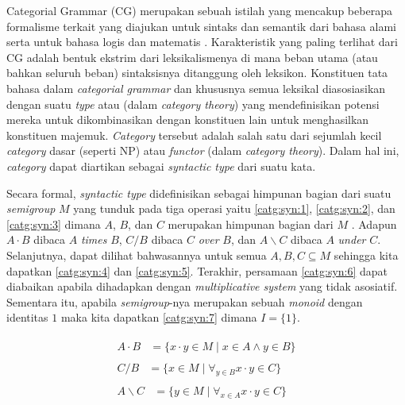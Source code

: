 Categorial Grammar (CG) merupakan sebuah istilah yang mencakup beberapa formalisme terkait yang diajukan
untuk sintaks dan semantik dari bahasa alami serta untuk bahasa logis dan matematis \citep{Steedman92catg}.
Karakteristik yang paling terlihat dari CG adalah bentuk ekstrim dari leksikalismenya di mana beban utama
(atau bahkan seluruh beban) sintaksisnya ditanggung oleh leksikon.
Konstituen tata bahasa dalam \textit{categorial grammar} dan khususnya semua leksikal diasosiasikan
dengan suatu \textit{type} atau  (dalam \textit{category theory}) yang
mendefinisikan potensi mereka untuk dikombinasikan dengan konstituen lain untuk menghasilkan konstituen
majemuk.
\textit{Category} tersebut adalah salah satu dari sejumlah kecil \textit{category} dasar (seperti NP)
atau \textit{functor} (dalam \textit{category theory}).
Dalam hal ini, \textit{category} dapat diartikan sebagai \textit{syntactic type} dari suatu kata.

Secara formal, \textit{syntactic type} didefinisikan sebagai himpunan bagian dari suatu
\textit{semigroup} $M$ yang tunduk pada tiga operasi yaitu \ref{catg:syn:1},
\ref{catg:syn:2}, dan \ref{catg:syn:3} dimana $A$, $B$, dan $C$ merupakan himpunan bagian dari $M$
\cite{Lambek1988}. Adapun $A \cdot B$ dibaca $A$ \textit{times} $B$, $C/B$ dibaca $C$ \textit{over}
$B$, dan $A\backslash{}C$ dibaca $A$ \textit{under} $C$. Selanjutnya, dapat dilihat bahwasannya
untuk semua $A, B, C \subseteq M$ sehingga kita dapatkan \ref{catg:syn:4} dan \ref{catg:syn:5}.
Terakhir, persamaan \ref{catg:syn:6} dapat diabaikan apabila dihadapkan dengan
\textit{multiplicative system} yang tidak asosiatif. Sementara itu, apabila \textit{semigroup}-nya
merupakan sebuah \textit{monoid} dengan identitas $1$ maka kita dapatkan \ref{catg:syn:7} dimana
$I = \{1\}$.

\begin{align}
  \begin{split}\label{catg:syn:1}
    A \cdot B & = \{x \cdot y \in M \mid x \in A \land y \in B\}
  \end{split}\\
  \begin{split}\label{catg:syn:2}
    C/B & = \{x \in M \mid \forall_{y \in B} x \cdot y \in C\}
  \end{split}\\
  \begin{split}\label{catg:syn:3}
    A\backslash{}C & = \{y \in M \mid \forall_{x \in A} x \cdot y \in C\}
  \end{split}
\end{align}

